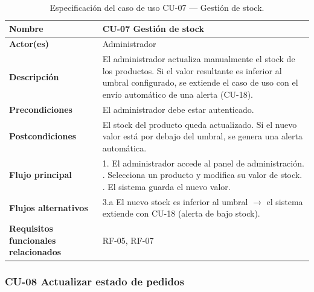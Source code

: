 \begin{table}[H]
\centering
\small
\begin{tabular}{|m{}|m{}|}
\hline
\textbf{Nombre} & CU-07 Gestión de stock \\ \hline
\textbf{Actor(es)} & Administrador \\ \hline
\textbf{Descripción} & El administrador actualiza manualmente el stock de los productos. Si el valor resultante es inferior al umbral configurado, se extiende el caso de uso con el envío automático de una alerta (CU-18). \\ \hline
\textbf{Precondiciones} & El administrador debe estar autenticado. \\ \hline
\textbf{Postcondiciones} & El stock del producto queda actualizado. Si el nuevo valor está por debajo del umbral, se genera una alerta automática. \\ \hline
\textbf{Flujo principal} & 1. El administrador accede al panel de administración. \newline 2. Selecciona un producto y modifica su valor de stock. \newline 3. El sistema guarda el nuevo valor. \\ \hline
\textbf{Flujos alternativos} & 3.a El nuevo stock es inferior al umbral $\rightarrow$ el sistema extiende con CU-18 (alerta de bajo stock). \\ \hline
\textbf{Requisitos funcionales relacionados} & RF-05, RF-07 \\ \hline
\end{tabular}
\caption{Especificación del caso de uso CU-07 — Gestión de stock.}
\end{table}

\subsubsection{CU-08 Actualizar estado de pedidos}

